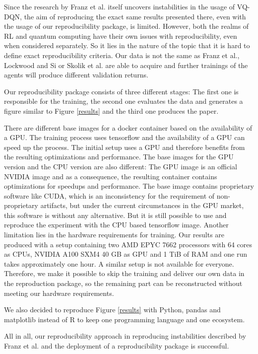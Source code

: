Since the research by Franz et al. itself uncovers instabilities in the usage of \ac{VQ-DQN}, the aim of reproducing the exact same results presented there, even with the usage of our reproducibility package, is limited. 
However, both the realms of \ac{RL}\autocite{rlrepro} and quantum computing\autocite{quantumrepro} have their own issues with reproducibility, even when considered separately. 
So it lies in the nature of the topic that it is hard to define exact reproducibility criteria.
Our data is not the same as Franz et al., Lockwood and Si or Skolik et al. are able to acquire and further trainings of the agents will produce different validation returns.


Our reproducibility package consists of three different stages: The first one is responsible for the training, the second one evaluates the data and generates a figure similar to Figure \ref{results} and the third one produces the paper. 

There are different base images for a docker container based on the availability of a GPU. 
The training process uses tensorflow and the availability of a GPU can speed up the process. 
The initial setup uses a GPU and therefore benefits from the resulting optimizations and performance.
The base images for the GPU version and the CPU version are also different: The GPU image is an official NVIDIA image and as a consequence, the resulting container contains optimizations for speedups and performance. 
The base image contains proprietary software like CUDA, which is an inconsistency for the requirement of non-proprietary artifacts, but under the current circumstances in the GPU market, this software is without any alternative.
But it is still possible to use and reproduce the experiment with the CPU based tensorflow image.
Another limitation lies in the hardware requirements for training. 
Our results are produced with a setup containing two AMD EPYC 7662 processors with 64 cores as CPUs, NVIDIA A100 SXM4 40 GB as GPU and 1 TiB of RAM and one run takes approximately one hour. 
A similar setup is not available for everyone.
Therefore, we make it possible to skip the training and deliver our own data in the reproduction package, so the remaining part can be reconstructed without meeting our hardware requirements. 

We also decided to reproduce Figure \ref{results} with Python, pandas and matplotlib instead of R to keep one programming language and one ecosystem. 

All in all, our reproducibility approach in reproducing instabilities described by Franz et al. and the deployment of a reproducibility package is successful.

